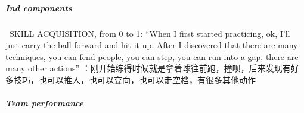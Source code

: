 \begin{CJK}{UTF8}{gbsn}









          \subparagraph{Ind components}



                 SKILL ACQUISITION, from 0 to 1: “When I first started practicing, ok, I’ll just carry the ball forward and hit it up. After I discovered that there are many techniques, you can fend people, you can step, you can run into a gap, there are many other actions”	：刚开始练得时候就是拿着球往前跑，撞呗，后来发现有好多技巧，也可以推人，也可以变向，也可以走空档，有很多其他动作 
          \subparagraph{Team performance}


\end{CJK}
